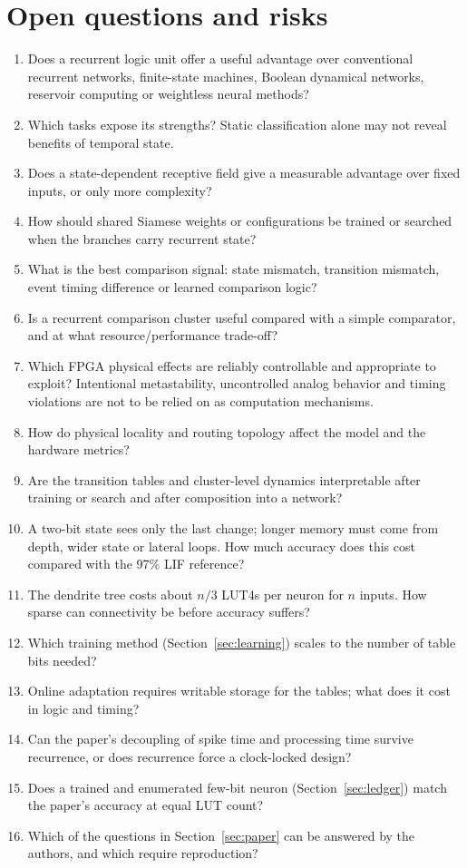 \section{Open questions and risks}
\label{sec:open}
\begin{enumerate}[leftmargin=1.5em]
\item Does a recurrent logic unit offer a useful advantage over conventional recurrent networks, finite-state machines, Boolean dynamical networks, reservoir computing or weightless neural methods?
\item Which tasks expose its strengths? Static classification alone may not reveal benefits of temporal state.
\item Does a state-dependent receptive field give a measurable advantage over fixed inputs, or only more complexity?
\item How should shared Siamese weights or configurations be trained or searched when the branches carry recurrent state?
\item What is the best comparison signal: state mismatch, transition mismatch, event timing difference or learned comparison logic?
\item Is a recurrent comparison cluster useful compared with a simple comparator, and at what resource/performance trade-off?
\item Which FPGA physical effects are reliably controllable and appropriate to exploit? Intentional metastability, uncontrolled analog behavior and timing violations are not to be relied on as computation mechanisms.
\item How do physical locality and routing topology affect the model and the hardware metrics?
\item Are the transition tables and cluster-level dynamics interpretable after training or search and after composition into a network?
\item A two-bit state sees only the last change; longer memory must come from depth, wider state or lateral loops. How much accuracy does this cost compared with the 97\% LIF reference?
\item The dendrite tree costs about $n/3$ LUT4s per neuron for $n$ inputs. How sparse can connectivity be before accuracy suffers?
\item Which training method (Section~\ref{sec:learning}) scales to the number of table bits needed?
\item Online adaptation requires writable storage for the tables; what does it cost in logic and timing?
\item Can the paper's decoupling of spike time and processing time survive recurrence, or does recurrence force a clock-locked design?
\item Does a trained and enumerated few-bit neuron (Section~\ref{sec:ledger}) match the paper's accuracy at equal LUT count?
\item Which of the questions in Section~\ref{sec:paper} can be answered by the authors, and which require reproduction?
\end{enumerate}
